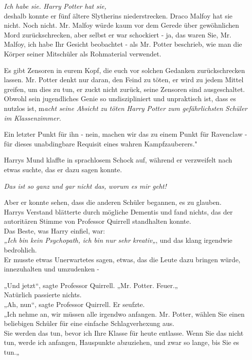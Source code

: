 {\emph{Ich habe sie. Harry Potter hat sie,}\\ deshalb konnte er fünf ältere Slytherins niederstrecken. Draco Malfoy hat sie nicht. Noch nicht. Mr. Malfoy würde kaum vor dem Gerede über gewöhnlichen Mord zurückschrecken, aber selbst er war schockiert - ja, das waren Sie, Mr. Malfoy, ich habe Ihr Gesicht beobachtet - als Mr. Potter beschrieb, wie man die Körper seiner Mitschüler als Rohmaterial verwendet.

Es gibt Zensoren in eurem Kopf, die euch vor solchen Gedanken zurückschrecken lassen. Mr. Potter denkt nur daran, den Feind zu töten, er wird zu jedem Mittel greifen, um dies zu tun, er zuckt nicht zurück, seine Zensoren sind ausgeschaltet.\\ Obwohl sein jugendliches Genie so undiszipliniert und unpraktisch ist, dass es nutzlos ist, m\emph{acht seine Absicht zu töten Harry Potter zum gefährlichsten Schüler im Klassenzimmer.}

Ein letzter Punkt für ihn - nein, machen wir das zu einem Punkt für Ravenclaw - für dieses unabdingbare Requisit eines wahren Kampfzauberers."

Harrys Mund klaffte in sprachlosem Schock auf, während er verzweifelt nach etwas suchte, das er dazu sagen konnte.

\emph{Das ist so ganz und gar nicht das, worum es mir geht!}

Aber er konnte sehen, dass die anderen Schüler begannen, es zu glauben.\\ Harrys Verstand blätterte durch mögliche Dementis und fand nichts, das der autoritären Stimme von Professor Quirrell standhalten konnte.\\ Das Beste, was Harry einfiel, war:\\ \emph{„Ich bin kein Psychopath, ich bin nur sehr kreativ„}, und das klang irgendwie bedrohlich.\\ Er musste etwas Unerwartetes sagen, etwas, das die Leute dazu bringen würde, innezuhalten und umzudenken -

„Und jetzt“, sagte Professor Quirrell. „Mr. Potter. Feuer.„\\ Natürlich passierte nichts.\\ „Ah, nun“, sagte Professor Quirrell. Er seufzte.\\ „Ich nehme an, wir müssen alle irgendwo anfangen. Mr. Potter, wählen Sie einen beliebigen Schüler für eine einfache Schlagverhexung aus.\\ Sie werden das tun, bevor ich Ihre Klasse für heute entlasse. Wenn Sie das nicht tun, werde ich anfangen, Hauspunkte abzuziehen, und zwar so lange, bis Sie es tun.„

}
